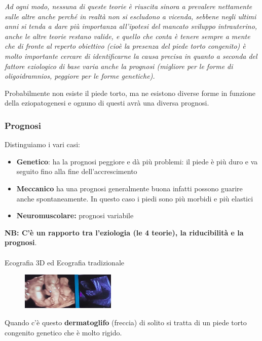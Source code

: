 \emph{Ad ogni modo, nessuna di queste teorie è riuscita sinora a prevalere nettamente sulle altre anche perché in realtà \emph{non si escludono a vicenda}, sebbene negli ultimi anni si tenda a dare più importanza all'ipotesi del mancato sviluppo intrauterino, anche le altre teorie restano valide, e quello che conta è tenere sempre a mente che di fronte al reperto obiettivo (cioè la presenza del piede torto congenito) è molto importante cercare di identificarne la causa precisa in quanto a seconda del fattore eziologico di base \emph{varia anche la prognosi}
(migliore per le forme di oligoidramnios, peggiore per le forme genetiche).}

Probabilmente non esiste il piede torto, ma ne esistono diverse forme in funzione della eziopatogenesi e ognuno di questi avrà una diversa prognosi.

\subsubsection{Prognosi}

Distinguiamo i vari casi:

\begin{itemize}
\item
  \textbf{Genetico}: ha la prognosi peggiore e dà più problemi: il piede è più duro e va seguito fino alla fine dell'accrescimento
\item
  \textbf{Meccanico} ha una prognosi generalmente buona infatti possono guarire anche spontaneamente. In questo caso i piedi sono più morbidi e più elastici
\item
  \textbf{Neuromuscolare:} prognosi variabile
\end{itemize}

\textbf{NB: C'è un rapporto tra l'eziologia (le 4 teorie), la riducibilità e la prognosi}.
\\\\
Ecografia 3D ed Ecografia tradizionale

\begin{figure}[!ht]
\centering
\includegraphics[width=0.4\textwidth]{016/image1.png}
\end{figure}

Quando c'è questo \textbf{dermatoglifo} (freccia) di solito si tratta di un piede torto congenito genetico che è molto rigido.

